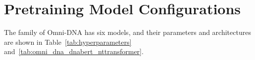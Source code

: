 \section{Pretraining Model Configurations}\label{app:pretrain-config}
The family of Omni-DNA has six models, and their parameters and architectures are shown in Table~\ref{tab:hyperparameters} and~\cref{tab:omni_dna_dnabert_nttransformer}.

\begin{table*}[ht!]
\centering
\caption{Architecture for 6 Omni-DNA models.}
\end{table*}


